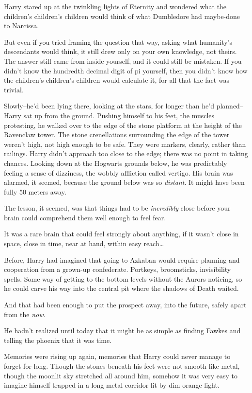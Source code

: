 Harry stared up at the twinkling lights of Eternity and wondered what the children's children's children would think of what Dumbledore had maybe-done to Narcissa.

But even if you tried framing the question that way, asking what humanity's descendants would think, it still drew only on your own knowledge, not theirs. The answer still came from inside yourself, and it could still be mistaken. If you didn't know the hundredth decimal digit of pi yourself, then you didn't know how the children's children's children would calculate it, for all that the fact was trivial.

\later

Slowly\---he'd been lying there, looking at the stars, for longer than he'd planned\---Harry sat up from the ground. Pushing himself to his feet, the muscles protesting, he walked over to the edge of the stone platform at the height of the Ravenclaw tower. The stone crenellations surrounding the edge of the tower weren't high, not high enough to be safe. They were markers, clearly, rather than railings. Harry didn't approach too close to the edge; there was no point in taking chances. Looking down at the Hogwarts grounds below, he was predictably feeling a sense of dizziness, the wobbly affliction called vertigo. His brain was alarmed, it seemed, because the ground below was so \emph{distant}. It might have been fully 50 meters away.

The lesson, it seemed, was that things had to be \emph{incredibly} close before your brain could comprehend them well enough to feel fear.

It was a rare brain that could feel strongly about anything, if it wasn't close in space, close in time, near at hand, within easy reach{\ldots}

Before, Harry had imagined that going to Azkaban would require planning and cooperation from a grown-up confederate. Portkeys, broomsticks, invisibility spells. Some way of getting to the bottom levels without the Aurors noticing, so he could carve his way into the central pit where the shadows of Death waited.

And that had been enough to put the prospect away, into the future, safely apart from the \emph{now}.

He hadn't realized until today that it might be as simple as finding Fawkes and telling the phoenix that it was time.

Memories were rising up again, memories that Harry could never manage to forget for long. Though the stones beneath his feet were not smooth like metal, though the moonlit sky stretched all around him, somehow it was very easy to imagine himself trapped in a long metal corridor lit by dim orange light.

